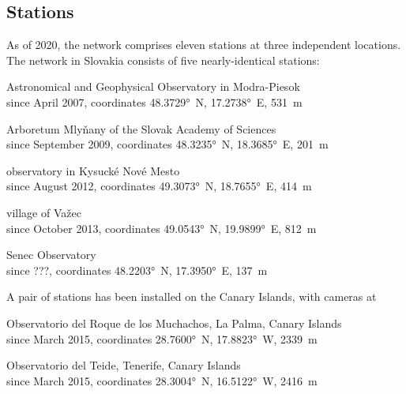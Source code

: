         \subsection{Stations} \label{ilas}
            As of 2020, the network comprises eleven stations at three independent locations.
            The network in Slovakia consists of five nearly-identical stations:
            \begin{description}[leftmargin = 25mm]
                \item[AGO]      Astronomical and Geophysical Observatory in Modra-Piesok\\
                                since April 2007, coordinates \ang{48.3729}~N, \ang{17.2738}~E, \SI{531}{\metre}
                \item[ARBO]     Arboretum Mlyňany of the Slovak Academy of Sciences\\
                                since September 2009, coordinates \ang{48.3235}~N, \ang{18.3685}~E, \SI{201}{\metre}
                \item[KNM]      observatory in Kysucké Nové Mesto\\
                                since August 2012, coordinates \ang{49.3073}~N, \ang{18.7655}~E, \SI{414}{\metre}
                \item[VAZEC]    village of Važec\\
                                since October 2013, coordinates \ang{49.0543}~N, \ang{19.9899}~E, \SI{812}{\metre}
                \item[SENEC]    Senec Observatory\\
                                since ???, coordinates \ang{48.2203}~N, \ang{17.3950}~E, \SI{137}{\metre} 
            \end{description}

            A pair of stations has been installed on the Canary Islands, with cameras at
            \begin{description}[leftmargin = 25mm]
                \item[LP]       Observatorio del Roque de los Muchachos, La Palma, Canary Islands\\
                                since March 2015, coordinates \ang{28.7600}~N, \ang{17.8823}~W, \SI{2339}{\metre}
                \item[TE]       Observatorio del Teide, Tenerife, Canary Islands\\
                                since March 2015, coordinates \ang{28.3004}~N, \ang{16.5122}~W, \SI{2416}{\metre}
            \end{description}

